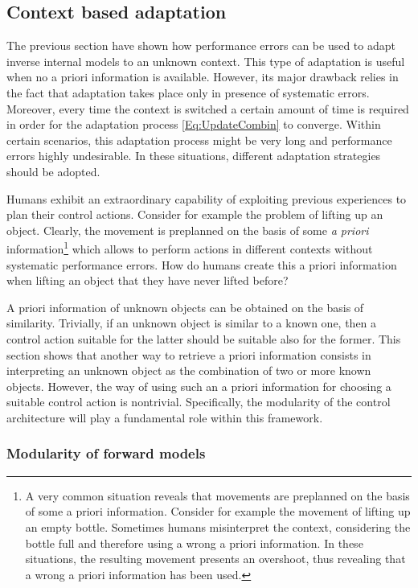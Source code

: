 \documentclass{svmult}
\begin{document}
\subsection{Context based adaptation} \label{Sec:ContextBasedAdapt}

The previous section have shown how performance errors can
be used to adapt inverse internal models to an unknown context.
This type of adaptation is useful when no a priori information
is available. However, its major drawback relies in the fact that
adaptation takes place only in presence of systematic errors. Moreover, every time 
the context is switched a certain amount of time is required in
order for the adaptation process \eqref{Eq:UpdateCombin} to 
converge. Within certain scenarios, this adaptation process
might be very long and performance errors highly undesirable.
In these situations, different adaptation strategies should be
adopted.   

Humans exhibit an extraordinary capability of exploiting previous
experiences to plan their control actions. Consider for example the problem of
lifting up an object. Clearly, the movement is preplanned on the
basis of some {\em a priori} information\footnote{A very common
situation reveals that movements are preplanned on the basis of some
a priori information. Consider for example the movement of lifting
up an empty bottle. Sometimes humans misinterpret the context,
considering the bottle full and therefore using a wrong a priori
information. In these situations, the resulting movement presents an
overshoot, thus revealing that a wrong a priori information has been
used.} which allows to perform actions in different contexts without 
systematic performance errors. How do humans create this a priori information
when lifting an object that they have never lifted before?

A priori information of unknown objects can be obtained on the basis of 
similarity. Trivially, if an unknown object is similar to a known
one, then a control action suitable for the latter should be 
suitable also for the former. This section shows
that another way to retrieve a priori information consists in
interpreting an unknown object as the combination of two or more
known objects. However, the way of using such an a priori information 
for choosing a suitable control action is nontrivial. Specifically, 
the modularity of the control architecture will play a fundamental 
role within this framework.

\subsubsection{Modularity of forward models}
\end{document}
